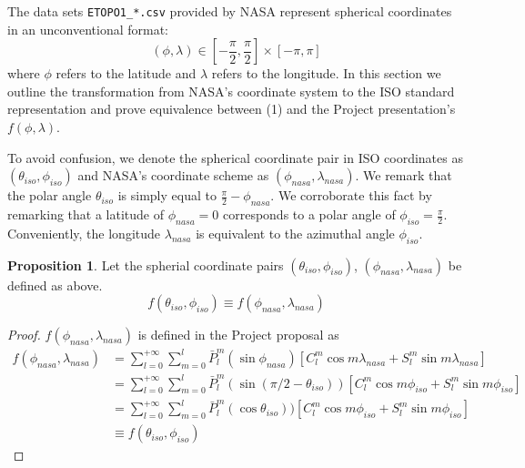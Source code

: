 \documentclass[a4paper]{article}
\theoremstyle{definition}
\newtheorem{proposition}{Proposition}
\begin{document}
The data sets \verb|ETOPO1_*.csv| provided by NASA represent spherical coordinates in an unconventional format: $$(\phi, \lambda) \in [-\frac{\pi}{2}, \frac{\pi}{2}] \times [-\pi, \pi] $$ where $\phi$ refers to the latitude
and $\lambda$ refers to the longitude. In this section we outline the transformation from NASA's coordinate system to the ISO standard representation and prove equivalence between (1) and the Project presentation's $f(\phi, \lambda)$.

To avoid confusion, we denote the spherical coordinate pair in ISO coordinates as $(\theta_{iso}, \phi_{iso})$ and NASA's coordinate scheme as $(\phi_{nasa}, \lambda_{nasa})$.
We remark that the polar angle $\theta_{iso}$ is simply equal to $\frac{\pi}{2} - \phi_{nasa}$. We corroborate this fact by remarking that a latitude of $\phi_{nasa} = 0$ corresponds to a polar
angle of $\phi_{iso} = \frac{\pi}{2}$. Conveniently, the longitude $\lambda_{nasa}$ is equivalent to the azimuthal angle $\phi_{iso}$.

\begin{proposition} Let the spherial coordinate pairs $(\theta_{iso}, \phi_{iso})$, $(\phi_{nasa}, \lambda_{nasa})$ be defined as above. 
    \begin{equation*}
        f(\theta_{iso}, \phi_{iso}) \equiv f(\phi_{nasa}, \lambda_{nasa})
    \end{equation*}
    
\end{proposition}

\begin{proof}
    $f(\phi_{nasa}, \lambda_{nasa})$ is defined in the Project proposal as 
    \begin{align} \label{eq:project_def} 
        f(\phi_{nasa}, \lambda_{nasa}) &= \sum_{l = 0}^{+\infty}\sum_{m = 0}^l \bar P_l^m(\sin\phi_{nasa})[C_l^m\cos m\lambda_{nasa} + S_l^m \sin m \lambda_{nasa}] \\ 
                                       &= \sum_{l = 0}^{+\infty}\sum_{m = 0}^l \bar P_l^m(\sin(\pi/2 - \theta_{iso}))[C_l^m\cos m\phi_{iso} + S_l^m \sin m \phi_{iso}] \\
                                       &= \sum_{l = 0}^{+\infty}\sum_{m = 0}^l \bar P_l^m(\cos\theta_{iso}))[C_l^m\cos m\phi_{iso} + S_l^m \sin m \phi_{iso}] \\
                                       &\equiv f(\theta_{iso}, \phi_{iso})
    \end{align}

\end{proof}
\end{document}
